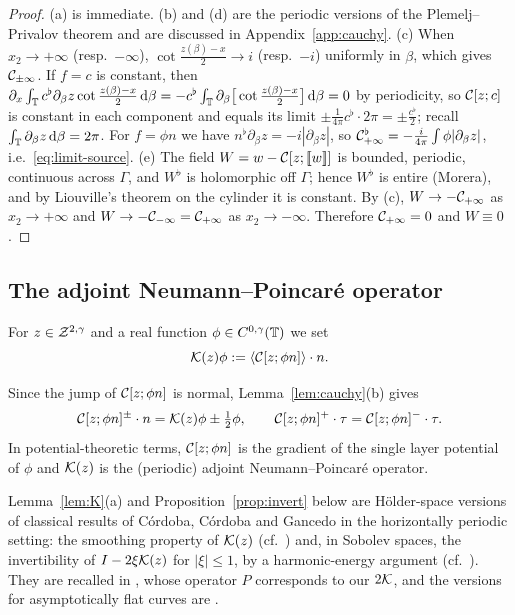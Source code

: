 \begin{proof}
(a) is immediate. (b) and (d) are the periodic versions of the Plemelj--Privalov theorem and are discussed in Appendix~\ref{app:cauchy}.
(c) When $x_2\to+\infty$ (resp.\ $-\infty$), $\cot\frac{z(\beta)-x}2\to i$ (resp.\ $-i$) uniformly in $\beta$, which gives $\mathcal{C}_{\pm\infty}$. If $f=c$ is constant, then
$\partial_x\int_{\mathbb{T}} c^\flat\partial_\beta z\cot\frac{z(\beta)-x}2\,\mathrm{d}\beta=-c^\flat\int_{\mathbb{T}}\partial_\beta\big[\cot\frac{z(\beta)-x}{2}\big]\,\mathrm{d}\beta=0$ by periodicity, so $\mathcal{C}[z;c]$ is constant
in each component and equals its limit $\pm\frac1{4\pi}c^\flat\cdot2\pi=\pm\frac{c^\flat}{2}$; recall $\int_{\mathbb{T}}\partial_\beta z\,\mathrm{d}\beta=2\pi$.
For $f=\phi n$ we have $n^\flat\partial_\beta z=-i|\partial_\beta z|$, so $\mathcal{C}_{+\infty}^\flat=-\frac i{4\pi}\int\phi|\partial_\beta z|$, i.e.\ \eqref{eq:limit-source}.
(e) The field $W=w-\mathcal{C}[z;[\![w]\!]]$ is bounded, periodic, continuous across $\Gamma$, and $W^\flat$ is holomorphic off $\Gamma$; hence $W^\flat$ is entire (Morera), and by Liouville's
theorem on the cylinder it is constant. By (c), $W\to-\mathcal{C}_{+\infty}$ as $x_2\to+\infty$ and $W\to-\mathcal{C}_{-\infty}=\mathcal{C}_{+\infty}$ as $x_2\to-\infty$. Therefore $\mathcal{C}_{+\infty}=0$ and $W\equiv0$.
\end{proof}

\subsection{The adjoint Neumann--Poincar\'e operator}

\begin{definition}\label{def:K}
For $z\in\mathcal{Z}^{2,\gamma}$ and a real function $\phi\in C^{0,\gamma}(\mathbb{T})$ we set
\[
\mathcal{K}(z)\phi:=\langle \mathcal{C}[z;\phi n]\rangle\cdot n .
\]
\end{definition}
Since the jump of $\mathcal{C}[z;\phi n]$ is normal, Lemma~\ref{lem:cauchy}(b) gives
\begin{equation}\label{eq:K-traces}
\mathcal{C}[z;\phi n]^\pm\cdot n=\mathcal{K}(z)\phi\pm\tfrac12\phi,\qquad \mathcal{C}[z;\phi n]^+\cdot\tau=\mathcal{C}[z;\phi n]^-\cdot\tau .
\end{equation}
In potential-theoretic terms, $\mathcal{C}[z;\phi n]$ is the gradient of the single layer potential of $\phi$ and $\mathcal{K}(z)$ is the (periodic) adjoint Neumann--Poincar\'e operator.

Lemma~\ref{lem:K}(a) and Proposition~\ref{prop:invert} below are H\"older-space versions of classical results of C\'ordoba, C\'ordoba and Gancedo \cite{CCG11} in the horizontally
periodic setting: the smoothing property of $\mathcal{K}(z)$ (cf.\ \cite[Lemmas~3.1 and~5.2]{CCG11}) and, in Sobolev spaces, the invertibility of $I-2\xi\mathcal{K}(z)$ for $|\xi|\le1$, by a
harmonic-energy argument (cf.\ \cite[Sec.~4]{CCG11}). They are recalled in \cite[Secs.~3.1.3, 8.2 and~8.3]{LM26}, whose operator $P$ corresponds to our $2\mathcal{K}$, and the versions
for asymptotically flat curves are \cite[Props.~6.1 and~8.3]{LM26}.

